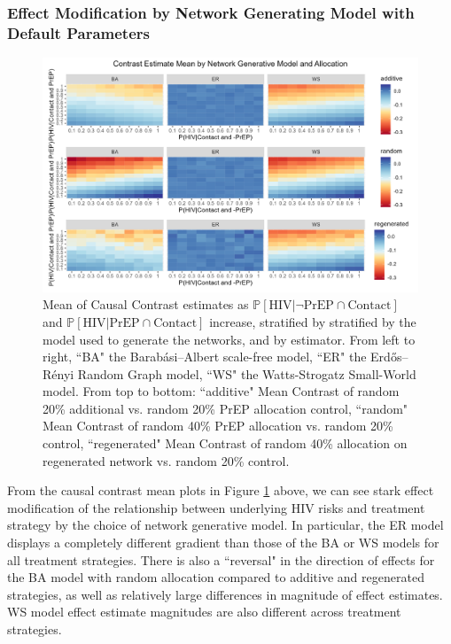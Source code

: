 \documentclass{article}
\theoremstyle{definition}
\begin{document}
\subsubsection{Effect Modification by Network Generating Model with Default Parameters}
\begin{figure}[H]
    \centering
    \includegraphics[width=\linewidth]{Figures/Generative Model Mean plots.png}
    \caption{Mean of Causal Contrast estimates as $\mathbb{P}\left[\text{HIV} \vert \neg \text{PrEP} \cap \text{Contact}\right]$ and $\mathbb{P}\left[\text{HIV} \vert \text{PrEP} \cap \text{Contact}\right]$ increase, stratified by stratified by the model used to generate the networks, and by estimator. From left to right, ``BA" the Barabási–Albert scale-free model, ``ER" the Erdős–Rényi Random Graph model, ``WS" the Watts-Strogatz Small-World model. From top to bottom: ``additive" Mean Contrast of random 20\% additional vs. random 20\% PrEP allocation control, ``random" Mean Contrast of random 40\% PrEP allocation vs. random 20\% control, ``regenerated" Mean Contrast of random 40\% allocation on regenerated network vs. random 20\% control. }
    \label{fig:Figure 23}
\end{figure}
From the causal contrast mean plots in Figure \ref{fig:Figure 23} above, we can see stark effect modification of the relationship between underlying HIV risks and treatment strategy by the choice of network generative model. In particular, the ER model displays a completely different gradient than those of the BA or WS models for all treatment strategies. There is also a ``reversal" in the direction of effects for the BA model with random allocation compared to additive and regenerated strategies, as well as relatively large differences in magnitude of effect estimates. WS model effect estimate magnitudes are also different across treatment strategies. 
\end{document}
